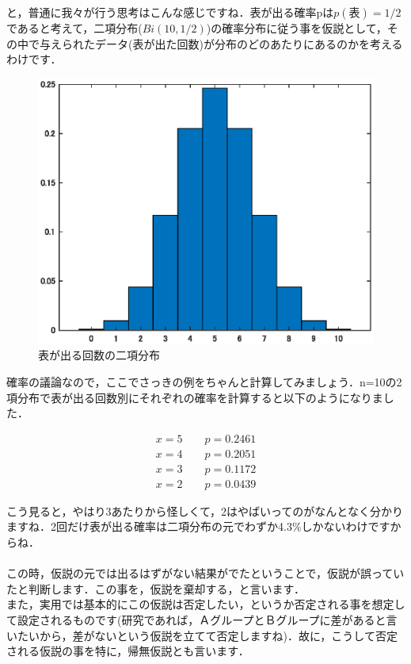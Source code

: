 \documentclass[11pt,a4paper]{ujreport} 	%
\begin{document}
と，普通に我々が行う思考はこんな感じですね．表が出る確率pは$p(表)=1/2$であると考えて，二項分布($Bi(10,1/2)$)の確率分布に従う事を仮説として，その中で与えられたデータ(表が出た回数)が分布のどのあたりにあるのかを考えるわけです．

\begin{figure}[H]
    \centering
    \includegraphics[width=120mm]{../figures/bino.eps}
    \caption{表が出る回数の二項分布}
\end{figure}

確率の議論なので，ここでさっきの例をちゃんと計算してみましょう．n=10の2項分布で表が出る回数別にそれぞれの確率を計算すると以下のようになりました．

\begin{align}
  x=5 \qquad p = 0.2461 \nonumber \\
  x=4 \qquad p = 0.2051 \nonumber \\
  x=3 \qquad p = 0.1172 \nonumber\\
  x=2 \qquad p = 0.0439 \nonumber
\end{align}

こう見ると，やはり3あたりから怪しくて，2はやばいってのがなんとなく分かりますね．2回だけ表が出る確率は二項分布の元でわずか4.3\%しかないわけですからね．\\
\\

この時，仮説の元では出るはずがない結果がでたということで，仮説が誤っていたと判断します．この事を，仮説を棄却する，と言います．\\

また，実用では基本的にこの仮説は否定したい，というか否定される事を想定して設定されるものです(研究であれば，ＡグループとＢグループに差があると言いたいから，差がないという仮説を立てて否定しますね)．故に，こうして否定される仮説の事を特に，帰無仮説とも言います．\\
\end{document}

